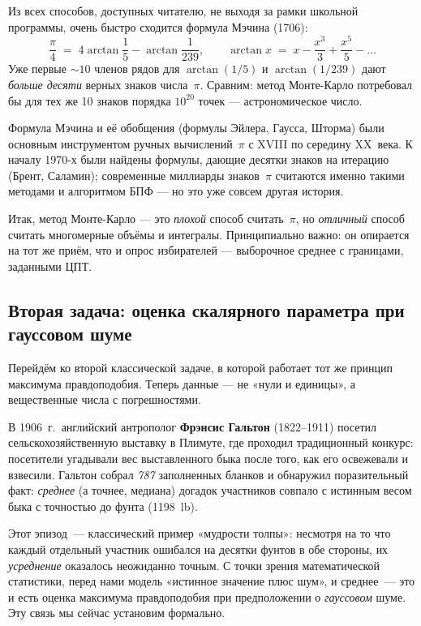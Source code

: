 \begin{notebox}[title={Самый быстрый «школьный» способ вычислить $\pi$}]
Из всех способов, доступных читателю, не выходя за рамки школьной
программы, очень быстро сходится формула Мэчина (1706):
\[
\frac{\pi}{4}\;=\;4\arctan\!\frac{1}{5}-\arctan\!\frac{1}{239},
\qquad
\arctan x\;=\;x-\frac{x^{3}}{3}+\frac{x^{5}}{5}-\dots
\]
Уже первые $\sim\!10$ членов рядов для $\arctan(1/5)$ и $\arctan(1/239)$
дают \emph{больше десяти} верных знаков числа~$\pi$. Сравним: метод
Монте-Карло потребовал бы для тех же 10 знаков порядка $10^{20}$ точек —
астрономическое число.

Формула Мэчина и её обобщения (формулы Эйлера, Гаусса, Шторма) были
основным инструментом ручных вычислений~$\pi$ с XVIII по середину
XX~века. К началу 1970-х были найдены формулы, дающие десятки знаков на
итерацию (Брент, Саламин); современные миллиарды знаков~$\pi$ считаются
именно такими методами и алгоритмом БПФ — но это уже совсем другая
история.
\end{notebox}

Итак, метод Монте-Карло — это \emph{плохой} способ считать~$\pi$, но
\emph{отличный} способ считать многомерные объёмы и интегралы.
Принципиально важно: он опирается на тот же приём, что и опрос
избирателей — выборочное среднее с границами, заданными ЦПТ.

\subsection{Вторая задача: оценка скалярного параметра при гауссовом шуме}
\label{ssec:gauss}

Перейдём ко второй классической задаче, в которой работает тот же
принцип максимума правдоподобия. Теперь данные — не «нули и единицы»,
а вещественные числа с погрешностями.

\begin{historybox}
В 1906~г.\ английский антрополог \textbf{Фрэнсис Гальтон} (1822–1911)
посетил сельскохозяйственную выставку в Плимуте, где проходил
традиционный конкурс: посетители угадывали вес выставленного быка после
того, как его освежевали и взвесили. Гальтон собрал \emph{787}
заполненных бланков и обнаружил поразительный факт: \emph{среднее} (а
точнее, медиана) догадок участников совпало с истинным весом быка
с точностью до фунта (1198~lb).

Этот эпизод~--- классический пример «мудрости толпы»: несмотря на то что
каждый отдельный участник ошибался на десятки фунтов в обе стороны,
их \emph{усреднение} оказалось неожиданно точным. С точки зрения
математической статистики, перед нами модель «истинное значение плюс
шум», и среднее~--- это и есть оценка максимума правдоподобия при
предположении о \emph{гауссовом} шуме. Эту связь мы сейчас установим
формально.
\end{historybox}

